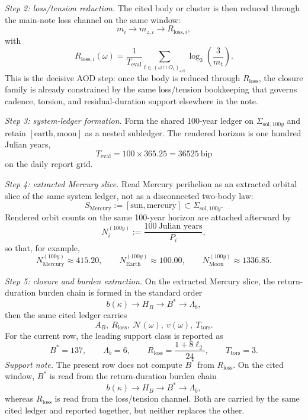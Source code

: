 \textit{Step 2: loss/tension reduction.} The cited body or cluster is then reduced through the main-note loss channel on the same window:
\[
m_i \longrightarrow m_{z,i} \longrightarrow R_{\mathrm{loss},i},
\]
with
\[
R_{\mathrm{loss},i}(\omega) = \frac{1}{T_{\mathrm{eval}}} \sum_{t\in(\omega\cap O_i)_{\mathrm{act}}} \log_3\!\left(\frac{3}{m_t}\right).
\]
This is the decisive AOD step: once the body is reduced through $R_{\mathrm{loss}}$, the closure family is already constrained by the same loss/tension bookkeeping that governs cadence, torsion, and residual-duration support elsewhere in the note.

\textit{Step 3: system-ledger formation.} Form the shared 100-year ledger on $\Sigma_{\mathrm{sol},100y}$ and retain $[\mathrm{earth},\mathrm{moon}]$ as a nested subledger. The rendered horizon is one hundred Julian years,
\[
T_{\mathrm{eval}} = 100 \times 365.25 = 36525\ \text{bip}
\]
on the daily report grid.

\textit{Step 4: extracted Mercury slice.} Read Mercury perihelion as an extracted orbital slice of the same system ledger, not as a disconnected two-body law:
\[
S_{\mathrm{Mercury}} := [\mathrm{sun},\mathrm{mercury}] \subset \Sigma_{\mathrm{sol},100y}.
\]
Rendered orbit counts on the same 100-year horizon are attached afterward by
\[
N_i^{(100y)} := \frac{100\ \text{Julian years}}{P_i},
\]
so that, for example,
\[
N_{\mathrm{Mercury}}^{(100y)} \approx 415.20,\qquad N_{\mathrm{Earth}}^{(100y)} \approx 100.00,\qquad N_{\mathrm{Moon}}^{(100y)} \approx 1336.85.
\]

\textit{Step 5: closure and burden extraction.} On the extracted Mercury slice, the return-duration burden chain is formed in the standard order
\[
b(\kappa) \longrightarrow H_B \longrightarrow B^* \longrightarrow \Lambda_b,
\]
then the same cited ledger carries
\[
A_B,\ R_{\mathrm{loss}},\ \mathcal{N}(\omega),\ v(\omega),\ T_{\mathrm{tors}}.
\]
For the current row, the leading support class is reported as
\[
B^*=137,\qquad \Lambda_b=6,\qquad R_{\mathrm{loss}} = \frac{1+8\ell_2}{24},\qquad T_{\mathrm{tors}}=3.
\]
\textit{Support note.} The present row does not compute $B^*$ from $R_{\mathrm{loss}}$. On the cited window, $B^*$ is read from the return-duration burden chain
\[
b(\kappa) \longrightarrow H_B \longrightarrow B^* \longrightarrow \Lambda_b,
\]
whereas $R_{\mathrm{loss}}$ is read from the loss/tension channel. Both are carried by the same cited ledger and reported together, but neither replaces the other.

